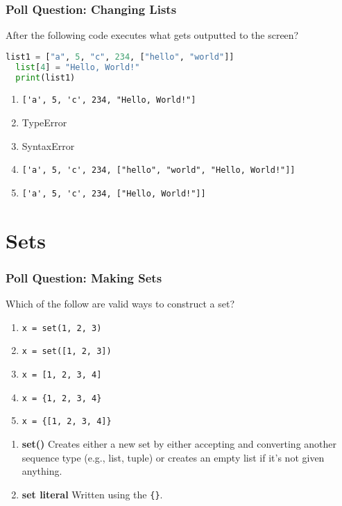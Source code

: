 \documentclass{beamer}
\begin{document}
%
%
\begin{frame}[fragile]
  \frametitle{Poll Question: Changing Lists}
  After the following code executes what gets outputted to the screen?
  \begin{lstlisting}[language=Python]
  list1 = ["a", 5, "c", 234, ["hello", "world"]]
  list[4] = "Hello, World!"
  print(list1)
  \end{lstlisting}
  \vfill
  \begin{enumerate}[A] 
    \item \lstinline|['a', 5, 'c', 234, "Hello, World!"]| %
    \item TypeError
    \item SyntaxError
    \item \lstinline|['a', 5, 'c', 234, ["hello", "world", "Hello, World!"]]|
    \item \lstinline|['a', 5, 'c', 234, ["Hello, World!"]]|
  \end{enumerate}
\end{frame}

\section{Sets}

%
%
\begin{frame}[fragile]
  \frametitle{Poll Question: Making Sets}
  Which of the follow are valid ways to construct a set?
  \begin{enumerate}[A] 
    \item \lstinline|x = set(1, 2, 3)|
    \item \lstinline|x = set([1, 2, 3])|
    \item \lstinline|x = [1, 2, 3, 4]|
    \item \lstinline|x = {1, 2, 3, 4}|
    \item \lstinline|x = {[1, 2, 3, 4]}|
  \end{enumerate}
  \pause
  \vfill
  \vfill
  \begin{enumerate}
    \item \textbf{set()} \textrightarrow Creates either a new set by either accepting and converting another sequence type (e.g., list, tuple) or creates an empty list if it's not given anything.
    \item \textbf{set literal} \textrightarrow Written using the \lstinline|{}|.
  \end{enumerate}
\end{frame}
\end{document}
